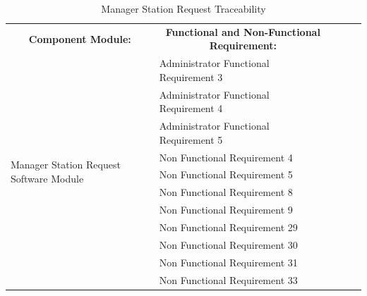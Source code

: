 \documentclass [10pt]{article}
\begin{document}
\begin{table}[h!]
\centering
\begin{tabular}{lllll}
\cline{1-2}
\multicolumn{1}{|c|}{\textbf{Component Module:}} & \multicolumn{1}{c|}{\textbf{Functional and Non-Functional Requirement:}} &  &  &  \\ \cline{1-2}
\multicolumn{1}{|l|}{\multirow{11}{*}{Manager Station Request Software Module}} & \multicolumn{1}{l|}{Administrator Functional Requirement 3} &  &  &  \\ \cline{2-2}
\multicolumn{1}{|l|}{} & \multicolumn{1}{l|}{Administrator Functional Requirement 4} &  &  &  \\ \cline{2-2}
\multicolumn{1}{|l|}{} & \multicolumn{1}{l|}{Administrator Functional Requirement 5} &  &  &  \\ \cline{2-2}
\multicolumn{1}{|l|}{} & \multicolumn{1}{l|}{Non Functional Requirement 4} &  &  &  \\ \cline{2-2}
\multicolumn{1}{|l|}{} & \multicolumn{1}{l|}{Non Functional Requirement 5} &  &  &  \\ \cline{2-2}
\multicolumn{1}{|l|}{} & \multicolumn{1}{l|}{Non Functional Requirement 8} &  &  &  \\ \cline{2-2}
\multicolumn{1}{|l|}{} & \multicolumn{1}{l|}{Non Functional Requirement 9} &  &  &  \\ \cline{2-2}
\multicolumn{1}{|l|}{} & \multicolumn{1}{l|}{Non Functional Requirement 29} &  &  &  \\ \cline{2-2}
\multicolumn{1}{|l|}{} & \multicolumn{1}{l|}{Non Functional Requirement 30} &  &  &  \\ \cline{2-2}
\multicolumn{1}{|l|}{} & \multicolumn{1}{l|}{Non Functional Requirement 31} &  &  &  \\ \cline{2-2}
\multicolumn{1}{|l|}{} & \multicolumn{1}{l|}{Non Functional Requirement 33} &  &  &  \\ \cline{1-2}
\end{tabular}
\caption{Manager Station Request Traceability}
\end{table}
\end{document}
